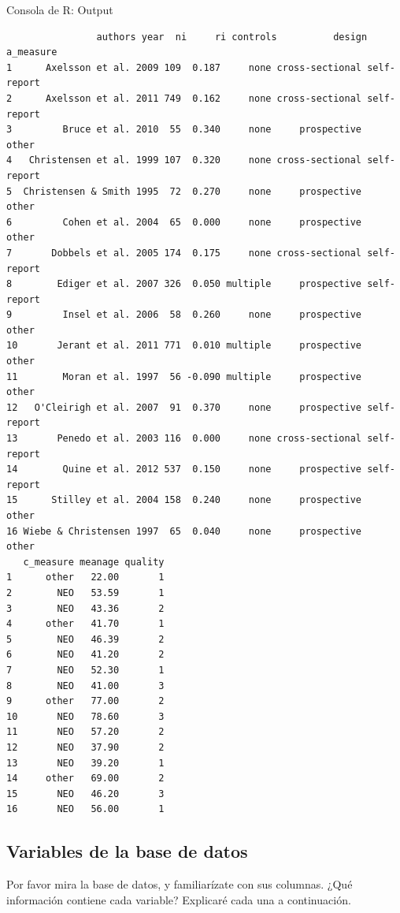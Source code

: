 \documentclass[
  bookmarksnumbered]{article}
\begin{document}
\begin{ROut}{Consola de R: Output~\thetcbcounter}
                \begin{footnotesize}
                \begin{verbatim}                authors year  ni     ri controls          design   a_measure
1      Axelsson et al. 2009 109  0.187     none cross-sectional self-report
2      Axelsson et al. 2011 749  0.162     none cross-sectional self-report
3         Bruce et al. 2010  55  0.340     none     prospective       other
4   Christensen et al. 1999 107  0.320     none cross-sectional self-report
5  Christensen & Smith 1995  72  0.270     none     prospective       other
6         Cohen et al. 2004  65  0.000     none     prospective       other
7       Dobbels et al. 2005 174  0.175     none cross-sectional self-report
8        Ediger et al. 2007 326  0.050 multiple     prospective self-report
9         Insel et al. 2006  58  0.260     none     prospective       other
10       Jerant et al. 2011 771  0.010 multiple     prospective       other
11        Moran et al. 1997  56 -0.090 multiple     prospective       other
12   O'Cleirigh et al. 2007  91  0.370     none     prospective self-report
13       Penedo et al. 2003 116  0.000     none cross-sectional self-report
14        Quine et al. 2012 537  0.150     none     prospective self-report
15      Stilley et al. 2004 158  0.240     none     prospective       other
16 Wiebe & Christensen 1997  65  0.040     none     prospective       other
   c_measure meanage quality
1      other   22.00       1
2        NEO   53.59       1
3        NEO   43.36       2
4      other   41.70       1
5        NEO   46.39       2
6        NEO   41.20       2
7        NEO   52.30       1
8        NEO   41.00       3
9      other   77.00       2
10       NEO   78.60       3
11       NEO   57.20       2
12       NEO   37.90       2
13       NEO   39.20       1
14     other   69.00       2
15       NEO   46.20       3
16       NEO   56.00       1
 \end{verbatim}
                \end{footnotesize}
                \end{ROut}

\hypertarget{variables-inf}{%
\subsection{Variables de la base de datos}\label{variables-inf}}

Por favor mira la base de datos, y familiarízate con sus columnas. ¿Qué información contiene cada variable? Explicaré cada una a continuación.
\end{document}
